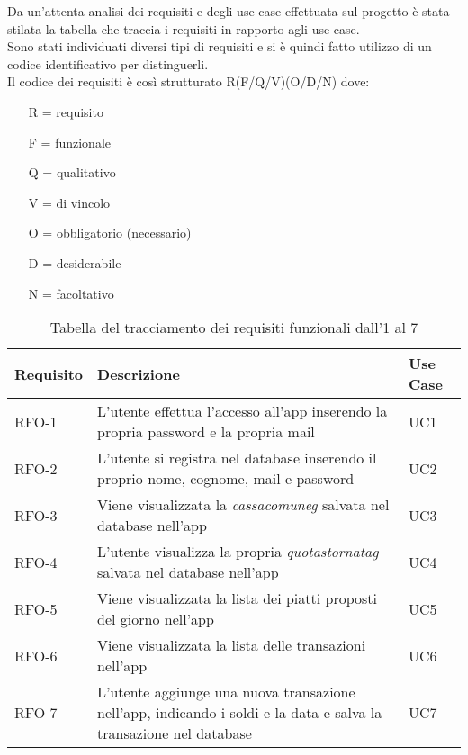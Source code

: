 Da un'attenta analisi dei requisiti e degli use case effettuata sul progetto è stata stilata la tabella che traccia i requisiti in rapporto agli use case.\\
Sono stati individuati diversi tipi di requisiti e si è quindi fatto utilizzo di un codice identificativo per distinguerli.\\
Il codice dei requisiti è così strutturato R(F/Q/V)(O/D/N) dove:
\begin{enumerate}
	\item[R =] requisito
    \item[F =] funzionale
    \item[Q =] qualitativo
    \item[V =] di vincolo
    \item[O =] obbligatorio (necessario)
    \item[D =] desiderabile
    \item[N =] facoltativo
\end{enumerate}


\begin{table}[htb]%
\caption{Tabella del tracciamento dei requisiti funzionali dall'1 al 7}
\label{tab:requisiti-funzionaliuno}
\begin{tabularx}{\textwidth}{lXl}
\hline
\textbf{Requisito} & \textbf{Descrizione} & \textbf{Use Case}\\
\hline\hline
RFO-1     & L'utente effettua l'accesso all'app inserendo la propria password e la propria mail & UC1 \\
\hline
RFO-2     & L'utente si registra nel database inserendo il proprio nome, cognome, mail e password & UC2 \\
\hline
RFO-3     & Viene visualizzata la \emph{\gls{cassacomuneg}} salvata nel database nell'app & UC3 \\
\hline
RFO-4     & L'utente visualizza la propria \emph{\gls{quotastornatag}} salvata nel database nell'app & UC4 \\
\hline
RFO-5     & Viene visualizzata la lista dei piatti proposti del giorno nell'app & UC5 \\
\hline
RFO-6     & Viene visualizzata la lista delle transazioni nell'app & UC6 \\
\hline
RFO-7     & L'utente aggiunge una nuova transazione nell'app, indicando i soldi e la data e salva la transazione nel database & UC7 \\
\hline
\end{tabularx}
\end{table}%

